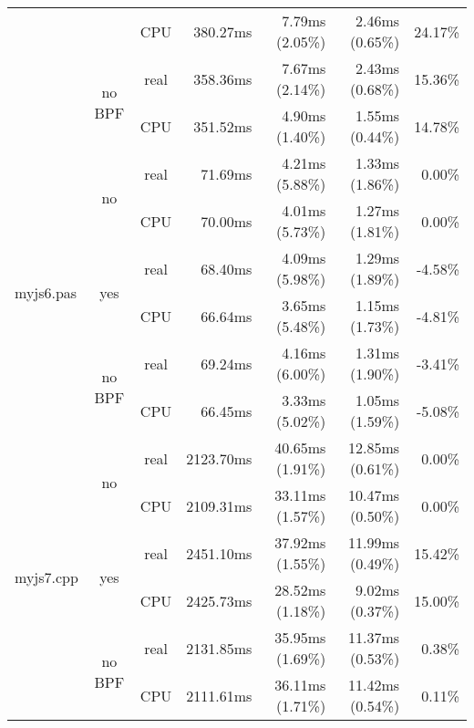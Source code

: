 \documentclass[en]{pracamgr}
\begin{document}
\begin{appendices}
\begin{small}
\begin{longtable}{|l|c|c|r|r|r|r|}
                            &                         & CPU  & 380.27ms & 7.79ms (2.05\%) & 2.46ms (0.65\%) & 24.17\% \\*
                            \cline{2-7}
                            & \multirow{2}{*}{no BPF} & real & 358.36ms & 7.67ms (2.14\%) & 2.43ms (0.68\%) & 15.36\% \\*
                            &                         & CPU  & 351.52ms & 4.90ms (1.40\%) & 1.55ms (0.44\%) & 14.78\% \\
\hline
\multirow{6}{*}{myjs6.pas}  & \multirow{2}{*}{no}     & real & 71.69ms & 4.21ms (5.88\%) & 1.33ms (1.86\%) & 0.00\% \\*
                            &                         & CPU  & 70.00ms & 4.01ms (5.73\%) & 1.27ms (1.81\%) & 0.00\% \\*
                            \cline{2-7}
                            & \multirow{2}{*}{yes}    & real & 68.40ms & 4.09ms (5.98\%) & 1.29ms (1.89\%) & -4.58\% \\*
                            &                         & CPU  & 66.64ms & 3.65ms (5.48\%) & 1.15ms (1.73\%) & -4.81\% \\*
                            \cline{2-7}
                            & \multirow{2}{*}{no BPF} & real & 69.24ms & 4.16ms (6.00\%) & 1.31ms (1.90\%) & -3.41\% \\*
                            &                         & CPU  & 66.45ms & 3.33ms (5.02\%) & 1.05ms (1.59\%) & -5.08\% \\
\hline
\multirow{6}{*}{myjs7.cpp}  & \multirow{2}{*}{no}     & real & 2123.70ms & 40.65ms (1.91\%) & 12.85ms (0.61\%) & 0.00\% \\*
                            &                         & CPU  & 2109.31ms & 33.11ms (1.57\%) & 10.47ms (0.50\%) & 0.00\% \\*
                            \cline{2-7}
                            & \multirow{2}{*}{yes}    & real & 2451.10ms & 37.92ms (1.55\%) & 11.99ms (0.49\%) & 15.42\% \\*
                            &                         & CPU  & 2425.73ms & 28.52ms (1.18\%) & 9.02ms (0.37\%) & 15.00\% \\*
                            \cline{2-7}
                            & \multirow{2}{*}{no BPF} & real & 2131.85ms & 35.95ms (1.69\%) & 11.37ms (0.53\%) & 0.38\% \\*
                            &                         & CPU  & 2111.61ms & 36.11ms (1.71\%) & 11.42ms (0.54\%) & 0.11\% \\

\end{longtable}
\end{small}
\end{appendices}
\end{document}
